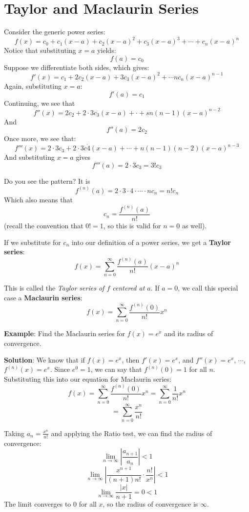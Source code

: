 \chapter{Taylor and Maclaurin Series}

Consider the generic power series:
$$f(x) = c_0 + c_1(x - a) + c_2(x - a)^2 + c_3(x - a)^3 + \cdots + c_n(x - a)^n$$
Notice that substituting $x = a$ yields:
$$f(a) = c_0$$
Suppose we differentiate both sides, which gives:
$$f'(x) = c_1 + 2c_2(x - a) + 3c_3(x - a)^2 + \cdots nc_n(x-a)^{n-1}$$
Again, substituting $x = a$:
$$f'(a) = c_1$$
Continuing, we see that
$$f''(x) = 2c_2 + 2 \cdot 3c_3(x-a) + \cdot + sn(n-1)(x-a)^{n-2}$$
And
$$f''(a) = 2c_2$$
Once more, we see that:
$$f'''(x) = 2 \cdot 3 c_3 + 2 \cdot 3 c\dot 4 (x-a) + \cdots + n (n-1)(n-2)(x-a)^{n-3}$$
And substituting $x = a$ gives
$$f'''(a) = 2 \cdot 3 c_3 = 3!c_3$$

Do you see the pattern? It is 
$$f^{(n)}(a) = 2 \cdot 3 \cdot 4 \cdot \cdots \cdot nc_n = n!c_n$$
Which also means that 
$$c_n = \frac{f^{(n)}(a)}{n!}$$
(recall the convention that $0! = 1$, so this is valid for $n = 0$ as well). 

If we substitute for $c_n$ into our definition of a power series, we get a \textbf{Taylor series}:
$$f(x) = \sum_{n=0}^\infty \frac{f^{(n)}(a)}{n!} \left( x - a \right)^n$$

This is called the \textit{Taylor series of $f$ centered at $a$}. If $a = 0$, we call this special case a \textbf{Maclaurin series}:
$$f(x) = \sum_{n=0}^\infty \frac{f^{(n)}(0)}{n!}x^n$$

\textbf{Example}: Find the Maclaurin series for $f(x) = e^x$ and its radius of convergence.

\textbf{Solution}: We know that if $f(x) = e^x$, then $f'(x) = e^x$, and $f''(x) = e^x$, $\cdots$, $f^{(n)}(x) = e^x$. Since $e^0 = 1$, we can say that $f^{(n)}(0) = 1$ for all $n$. Substituting this into our equation for Maclaurin series:
$$f(x) = \sum_{n=0}^\infty \frac{f^{(n)}(0)}{n!}x^n = \sum_{n=0}^\infty \frac{1}{n!}x^n $$
$$= \sum_{n=0}^\infty \frac{x^n}{n!}$$

Taking $a_n = \frac{x^n}{n!}$ and applying the Ratio test, we can find the radius of convergence:
$$\lim_{n \to \infty} \left| \frac{a_{n + 1}}{a_n} \right| < 1$$
$$\lim_{n \to \infty} \left| \frac{x^{n + 1}}{(n+1)n!} \cdot \frac{n!}{x^n} \right| < 1$$
$$\lim_{n \to \infty} \frac{|x|}{n + 1} = 0 < 1$$
The limit converges to 0 for all $x$, so the radius of convergence is $\infty$. 

